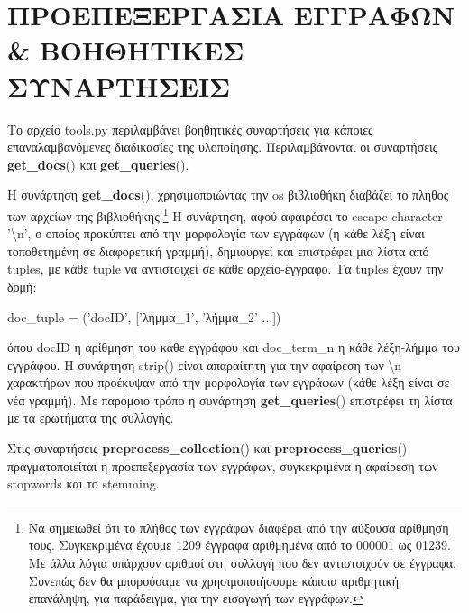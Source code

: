 ﻿\documentclass[12pt]{report}
\begin{document}
        \section{ΠΡΟΕΠΕΞΕΡΓΑΣΙΑ ΕΓΓΡΑΦΩΝ \& ΒΟΗΘΗΤΙΚΕΣ ΣΥΝΑΡΤΗΣΕΙΣ}

            Το αρχείο {\fontCode\small tools.py} περιλαμβάνει βοηθητικές συναρτήσεις για κάποιες επαναλαμβανόμενες διαδικασίες της υλοποίησης.
            Περιλαμβάνονται οι συναρτήσεις {\fontCode\small \textbf{get\_docs}()} και {\fontCode\small \textbf{get\_queries}()}.

            Η συνάρτηση {\fontCode\small \textbf{get\_docs}()}, χρησιμοποιώντας την {\fontCode\small os} βιβλιοθήκη
            διαβάζει το πλήθος των αρχείων της βιβλιοθήκης.\footnote{Να σημειωθεί ότι το πλήθος των εγγράφων διαφέρει από την αύξουσα αρίθμησή τους. Συγκεκριμένα έχουμε 1209 έγγραφα αριθμημένα από το {\fontCode\scriptsize 000001} ως {\fontCode\scriptsize 01239}. Με άλλα λόγια υπάρχουν αριθμοί στη συλλογή που δεν αντιστοιχούν σε έγγραφα. Συνεπώς δεν θα μπορούσαμε να χρησιμοποιήσουμε κάποια αριθμητική επανάληψη, για παράδειγμα, για την εισαγωγή των εγγράφων.}
            Η συνάρτηση, αφού αφαιρέσει το escape character {\fontCode\small '\textbackslash n'}, ο οποίος προκύπτει από την μορφολογία των εγγράφων (η κάθε λέξη είναι τοποθετημένη σε διαφορετική γραμμή),
            δημιουργεί \linebreak και επιστρέφει μια λίστα από tuples, με κάθε tuple να αντιστοιχεί σε κάθε αρχείο-έγγραφο. \linebreak Τα tuples έχουν την δομή:
                \begin{graycomment} \centering
                {\fontCode\footnotesize doc\_tuple = ('docID', ['λήμμα\_1', 'λήμμα\_2' ...])}
                \end{graycomment}

            \noindent όπου {\fontCode\small docID} η αρίθμηση του κάθε εγγράφου και {\fontCode\small doc\_term\_n} η κάθε λέξη-λήμμα του εγγράφου. \linebreak
            Η συνάρτηση {\fontCode\small strip()} είναι απαραίτητη για την αφαίρεση των {\fontCode\small \textbackslash n} χαρακτήρων
            που προέκυψαν από την μορφολογία των εγγράφων (κάθε λέξη είναι σε νέα γραμμή).
            Με παρόμοιο τρόπο η συνάρτηση {\fontCode\small \textbf{get\_queries}()} επιστρέφει τη λίστα με τα ερωτήματα της συλλογής.

            Στις συναρτήσεις {\fontCode\small \textbf{preprocess\_collection}()} και {\fontCode\small \textbf{preprocess\_queries}()}
            πραγματοποιείται η προεπεξεργασία των εγγράφων, συγκεκριμένα η αφαίρεση των stopwords και το stemming.
\end{document}
